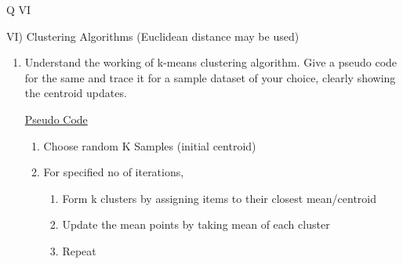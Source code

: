 \documentclass[12pt]{article}
\renewcommand{\_}{\kern-1.5pt\textunderscore\kern-1.5pt}
\begin{document}
\vspace{\baselineskip}

\vspace{\baselineskip}
\begin{Center}
{\fontsize{28pt}{33.6pt}\selectfont Q VI\par}
\end{Center}\par

{\fontsize{14pt}{16.8pt}\selectfont VI) Clustering Algorithms (Euclidean distance may be used)\par}\par

\begin{enumerate}
	\item {\fontsize{14pt}{16.8pt}\selectfont Understand the working of k-means clustering algorithm. Give a pseudo code for the same and trace it for a sample dataset of your choice, clearly showing the centroid updates.\par}\par

{\fontsize{14pt}{16.8pt}\selectfont \uline{Pseudo Code}\par}\par

\begin{enumerate}
	\item {\fontsize{14pt}{16.8pt}\selectfont Choose random K Samples (initial centroid)\par}\par

	\item {\fontsize{14pt}{16.8pt}\selectfont For specified no of iterations, \par}\par

\begin{enumerate}
	\item {\fontsize{14pt}{16.8pt}\selectfont Form k clusters by assigning items to their closest mean/centroid\par}\par

	\item {\fontsize{14pt}{16.8pt}\selectfont Update the mean points by taking mean of each cluster\par}\par

	\item {\fontsize{14pt}{16.8pt}\selectfont Repeat\par}
\end{enumerate}
\end{enumerate}\par


\end{enumerate}
\end{document}
